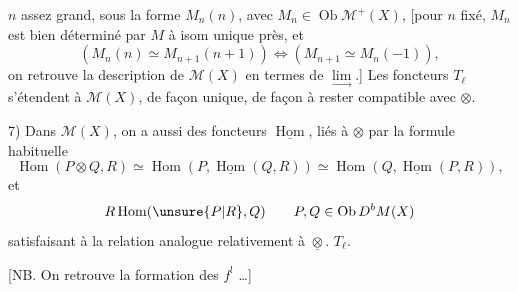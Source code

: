 $n$ assez grand, sous la forme
$M_n(n)$, avec $M_n\in\operatorname{Ob}\mathcal{M}^+(X)$, [pour $n$ fixé,
$M_n$ est bien déterminé par $M$ à isom unique
près, et
\[
(M_n(n)\simeq M_{n+1}(n+1))\Longleftrightarrow(M_{n+1}\simeq M_n(-1)),
\]
on retrouve la description de $\mathcal{M}(X)$ en
termes de $\underset{\longrightarrow}{\lim}$.]
Les foncteurs
$T_\ell$ s'étendent à $\mathcal{M}(X)$, de façon unique, de façon
à rester compatible avec $\otimes$.

7) Dans $\mathcal{M}(X)$, on a aussi des foncteurs
$\underline{\operatorname{Hom}}$, liés à $\otimes$ par la formule
habituelle
\[
\operatorname{Hom}(P\otimes Q,R)\simeq
\operatorname{Hom}(P,\underline{\operatorname{Hom}}(Q,R))
\simeq\operatorname{Hom}(Q,\underline{\operatorname{Hom}}(P,R)),
\]
et 
\[
R\operatorname{Hom}(\unsure{P|R},Q)
\qquad P,Q\in\operatorname{Ob}D^bM(X)
\]
satisfaisant à la relation analogue
relativement à $\underline{\otimes}$.
 $T_\ell$.

 [NB. On retrouve la formation
des $f^!$ \ldots]
